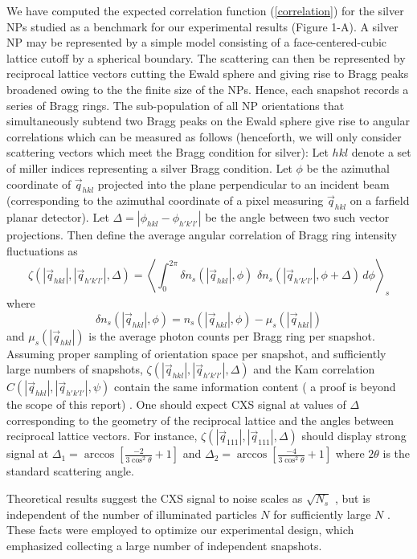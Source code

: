 \documentclass [11pt,fleqn]{article}
\def \be {\begin{equation}}
\def \ee {\end{equation}}
\begin{document}
We have computed the expected correlation function (\ref{correlation}) for the silver NPs studied as a benchmark for our experimental results (Figure 1-A). A silver NP may be represented by a simple model consisting of a face-centered-cubic lattice cutoff by a spherical boundary. The scattering can then be represented by reciprocal lattice vectors cutting the Ewald sphere and giving rise to Bragg peaks broadened owing to the the finite size of the NPs. Hence, each snapshot records a series of Bragg rings. The sub-population of all NP orientations that simultaneously subtend two Bragg peaks on the Ewald sphere give rise to angular correlations which can be measured as follows (henceforth, we will only consider scattering vectors which meet the Bragg condition for silver):  Let $hkl$ denote a set of miller indices representing a silver Bragg condition. Let $\phi$ be the azimuthal coordinate of $\vec{q}_{hkl}$ projected into the plane perpendicular to an incident beam (corresponding to the azimuthal coordinate of a pixel measuring $\vec{q}_{hkl}$ on a farfield planar detector). Let $\Delta = |\phi_{hkl} - \phi_{h'k'l'}|$ be the angle between two such vector projections. Then define the average angular correlation of Bragg ring intensity fluctuations as
\be \label{angular}
\zeta (|\vec{q}_{hkl}|,|\vec{q}_{h'k'l'}|, \Delta  ) = \left \langle \int_{0}^{2\pi} \delta n_{s} (| \vec{q}_{hkl}|,\phi ) \,\, \delta n_{s} (|\vec{q}_{h'k'l'}|,\phi + \Delta )\, d\phi  \right \rangle_{s}
\ee
where
\[
\delta n_s( | \vec{q}_{hkl} | , \phi) = n_s( |\vec{q}_{hkl}|,\phi) - \mu_s( |\vec{q}_{hkl}|) 
\]
 and $\mu_s( |\vec{q}_{hkl}|)$ is the average photon counts per Bragg ring per snapshot. Assuming proper sampling of orientation space per snapshot, and sufficiently large numbers of snapshots, $\zeta (|\vec{q}_{hkl}|,|\vec{q}_{h'k'l'}|, \Delta  )$ and the Kam correlation $C (|\vec{q}_{hkl}|,|\vec{q}_{h'k'l'}|, \psi  )$ contain the same information content ( a proof is beyond the scope of this report) . One should expect CXS signal at values of $\Delta $ corresponding to the geometry of the reciprocal lattice and the angles between reciprocal lattice vectors. For instance, $\zeta (|\vec{q}_{111}|,|\vec{q}_{111}|, \Delta  )$ should display strong signal at $\Delta_1 = \arccos[ \frac{-2}{3\cos^{2}\theta} + 1  ]$ and $\Delta_2 = \arccos[ \frac{-4}{3\cos^{2}\theta} + 1  ]$ where $2\theta$ is the standard scattering angle.

Theoretical results suggest the CXS signal to noise scales as $\sqrt{N_{s}}$ , but is independent of the number of illuminated particles $N$ for sufficiently large $N$ \cite{Kam:1977wc, Kam:1981ua, Kirian:2011bq}. These facts were employed to optimize our experimental design, which emphasized collecting a large number of independent snapshots.
\end{document}
